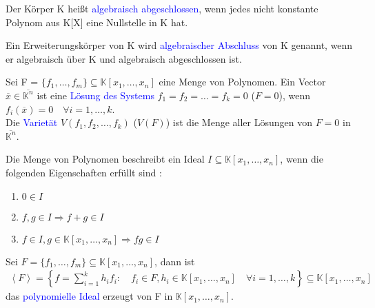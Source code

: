 \begin{definition}
Der Körper K heißt \textcolor{blue}{algebraisch abgeschlossen}, wenn jedes nicht konstante Polynom aus K[X] eine Nullstelle in K hat. \cite{Karpfinger}
\end{definition}

\begin{definition}
Ein Erweiterungskörper von K wird \textcolor{blue}{algebraischer Abschluss} von K genannt, wenn er algebraisch über K und algebraisch abgeschlossen ist. \cite{Karpfinger}
\end{definition}

\begin{definition}
Sei F = $\{f_1,\ldots,f_m\} \subseteq \mathbb{K}[x_1,\ldots,x_n]$ eine Menge von Polynomen. Ein Vector $\overline{x} \in \overline{\mathbb{K}^n}$ ist eine \textcolor{blue}{Lösung des Systems} $f_1 = f_2 = \ldots = f_k=0$ ($F = 0$), wenn $f_i(\overline{x})=0 \quad \forall i=1,\dots,k$.\\
Die \textcolor{blue}{Varietät} $V(f_1,f_2,\ldots,f_k)$ ($V(F)$) ist die Menge aller Lösungen von $F=0$ in $\overline{\mathbb{K}^n}$.\cite{Ausgangsartikel}
\end{definition}

\begin{definition}
Die Menge von Polynomen beschreibt ein Ideal $I \subseteq \mathbb{K}[x_1,\ldots,x_n]$, wenn die folgenden Eigenschaften erfüllt sind \cite{Ausgangsartikel}:
\begin{enumerate}
\item $0 \in I$
\item $f,g \in I \Rightarrow f+g \in I$
\item $f \in I, g \in \mathbb{K}[x_1,\ldots,x_n] \Rightarrow fg \in I$
\end{enumerate}
Sei $F = \{f_1,\ldots,f_m\} \subseteq \mathbb{K}[x_1,\ldots,x_n]$, dann ist
\begin{align*}
\left\langle F \right\rangle = \left\{f = \sum_{i=1}^k h_if_i: \quad f_i \in F, h_i \in \mathbb{K}[x_1,\ldots,x_n] \quad \forall i = 1,\ldots,k\right\} \subseteq \mathbb{K}[x_1,\ldots,x_n]
\end{align*}
das \textcolor{blue}{polynomielle Ideal} erzeugt von F in $\mathbb{K}[x_1,\ldots,x_n]$.
\end{definition}

